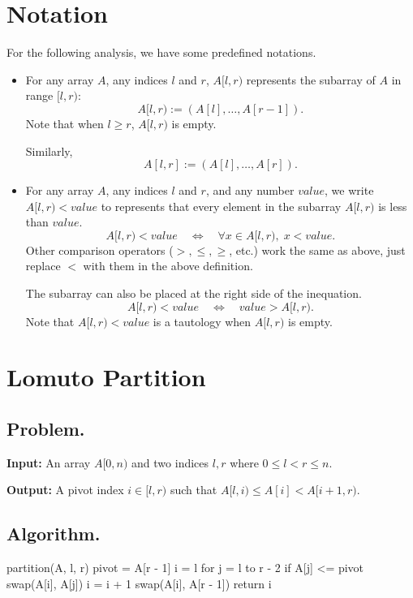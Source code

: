 \documentclass[12pt]{article}
\begin{document}
\section*{Notation}

For the following analysis, we have some predefined notations.
\begin{itemize}
    \item For any array \(A\), any indices \(l\) and \(r\), \(A[l, r)\) represents the subarray of \(A\) in range \([l, r)\):
    \[
        A[l, r) := (A[l], \dots, A[r-1]).
    \]
    Note that when \(l \geq r\), \(A[l, r)\) is empty.

    Similarly,
    \[
        A[l, r] := (A[l], \dots, A[r]).
    \]
    \item For any array \(A\), any indices \(l\) and \(r\), and any number \(value\), we write \(A[l, r) < value\) to represents that every element in the subarray \(A[l, r)\) is less than \(value\).
    \[
        A[l, r) < value \quad \Longleftrightarrow \quad \forall x \in A[l, r), \; x < value.
    \]
    Other comparison operators (\(>, \leq, \geq\), etc.) work the same as above, just replace \(<\) with them in the above definition.

    The subarray can also be placed at the right side of the inequation.
    \[
        A[l, r) < value \quad \Longleftrightarrow \quad value > A[l, r).
    \]
    Note that \(A[l, r) < value\) is a tautology when \(A[l, r)\) is empty.
\end{itemize}

\newpage

\section*{Lomuto Partition}

\subsection*{Problem.}

\noindent\textbf{Input:} An array \(A[0, n)\) and two indices \(l, r\) where \(0 \leq l < r \leq n\).

\noindent\textbf{Output:} A pivot index \(i \in [l, r)\) such that \(A[l, i) \leq A[i] < A[i+1, r)\).

\subsection*{Algorithm.}

\begin{pseudocode}
partition(A, l, r)
    pivot = A[r - 1]
    i = l
    for j = l to r - 2
        if A[j] <= pivot
            swap(A[i], A[j])
            i = i + 1
    swap(A[i], A[r - 1])
    return i
\end{pseudocode}
\end{document}
